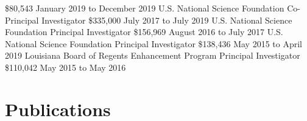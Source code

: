 \documentclass{cv}
\begin{document}
	{\$80,543}{}
	{January 2019 to December 2019}
	{U.S. National Science Foundation}
	{Co-Principal Investigator}
	{\$335,000}{}
	{July 2017 to July 2019}
	{U.S. National Science Foundation}
	{Principal Investigator}
	{\$156,969}{}
	{August 2016 to July 2017}
	{U.S. National Science Foundation}
	{Principal Investigator}
	{\$138,436}{}
	{May 2015 to April 2019}
	{Louisiana Board of Regents Enhancement Program}
	{Principal Investigator}
	{\$110,042}{}
	{May 2015 to May 2016}


\section*{Publications}
\end{document}
